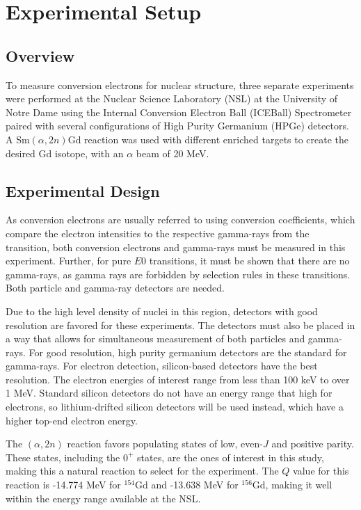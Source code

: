 %
%

\chapter{Experimental Setup}
\label{chap:setup}

\section{Overview}

To measure conversion electrons for nuclear structure, three separate experiments were performed at the Nuclear Science Laboratory (NSL) at the University of Notre Dame using the Internal Conversion Electron Ball (ICEBall) Spectrometer paired with several configurations of High Purity Germanium (HPGe) detectors. A Sm$(\alpha,2n)$Gd reaction was used with different enriched targets to create the desired Gd isotope, with an $\alpha$ beam of 20 MeV.

\section{Experimental Design}

As conversion electrons are usually referred to using conversion coefficients, which compare the electron intensities to the respective gamma-rays from the transition, both conversion electrons and gamma-rays must be measured in this experiment. Further, for pure $E0$ transitions, it must be shown that there are no gamma-rays, as gamma rays are forbidden by selection rules in these transitions. Both particle and gamma-ray detectors are needed.

Due to the high level density of nuclei in this region, detectors with good resolution are favored for these experiments. The detectors must also be placed in a way that allows for simultaneous measurement of both particles and gamma-rays. For good resolution, high purity germanium detectors are the standard for gamma-rays. For electron detection, silicon-based detectors have the best resolution. The electron energies of interest range from less than 100 keV to over 1 MeV. Standard silicon detectors do not have an energy range that high for electrons, so lithium-drifted silicon detectors will be used instead, which have a higher top-end electron energy.

The $(\alpha,2n)$ reaction favors populating states of low, even-$J$ and positive parity. These states, including the $0^+$ states, are the ones of interest in this study, making this a natural reaction to select for the experiment. The $Q$ value for this reaction is -14.774 MeV for $^{154}$Gd and -13.638 MeV for $^{156}$Gd, making it well within the energy range available at the NSL.

